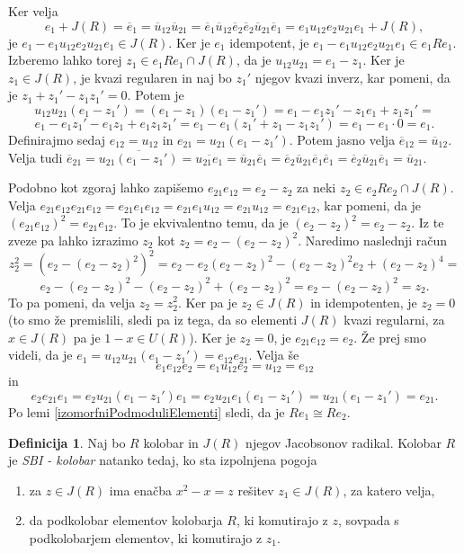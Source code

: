 \documentclass[a4paper, 12pt]{amsart}
\theoremstyle{definition} %
\newtheorem{definicija}{Definicija}[section]
\theoremstyle{plain} %
\begin{document}
Ker velja 
$$
e_1 + J(R) = \overline{e}_1 = \overline{u}_{12} \overline{u}_{21} = \overline{e}_1 \overline{u}_{12} \overline{e}_2 \overline{e}_2 \overline{u}_{21} \overline{e}_1 = e_1 u_{12} e_2 u_{21} e_1 + J(R),
$$
je $e_1 - e_1 u_{12} e_2 u_{21} e_1 \in J(R)$. Ker je $e_1$ idempotent, je  $e_1 - e_1 u_{12} e_2 u_{21} e_1 \in e_1 R e_1$. Izberemo lahko torej $z_1 \in e_1Re_1 \cap J(R)$, da je $u_{12}u_{21} = e_1 - z_1$. Ker je $z_1\in J(R)$, je kvazi regularen in naj bo $z_1'$ njegov kvazi inverz, kar pomeni, da je $z_1 + z_1' - z_1 z_1' = 0$. Potem je 
$$
u_{12} u_{21} (e_1 - z_1') = (e_1 - z_1)(e_1 - z_1') = e_1 - e_1 z_1' - z_1 e_1 + z_1 z_1' = 
$$
$$
e_1 - e_1 z_1' - e_1 z_1 + e_1 z_1 z_1' = e_1 - e_1 (z_1' +z_1 - z_1 z_1') = e_1  - e_1 \cdot 0 = e_1.
$$
Definirajmo sedaj $e_{12} = u_{12} $ in $e_{21} = u_{21} (e_1 - z_1')$. Potem jasno velja $\overline{e}_{12} = \overline{u}_{12}$. Velja tudi $\overline{e}_{21} = \overline{u_{21}(e_1 - z_1')} = \overline{u_{21} e_1} = \overline{u}_{21} \overline{e}_1 = \overline{e}_2 \overline{u}_{21} \overline{e}_1 \overline{e}_1 =  \overline{e}_2 \overline{u}_{21} \overline{e}_1 = \overline{u}_{21}$.

Podobno kot zgoraj lahko zapišemo $e_{21} e_{12} = e_2 - z_2 $ za neki $z_2 \in e_2 Re_2 \cap J(R)$. Velja $e_{21}e_{12}e_{21}e_{12} = e_{21} e_1 e_{12} = e_{21} e_1 u_{12} = e_{21} u_{12} = e_{21} e_{12}$, kar pomeni, da je $(e_{21} e_{12})^2 = e_{21} e_{12}$. To je ekvivalentno temu, da je $(e_2 - z_2 )^2 = e_2 - z_2$. Iz te zveze pa lahko izrazimo $z_2$ kot $z_2 = e_2 - (e_2 - z_2)^2$. Naredimo naslednji račun
$$
z_2^2 = (e_2 - (e_2 - z_2)^2)^2 = e_2 - e_2(e_2-z_2)^2 - (e_2 - z_2 )^2 e_2 + (e_2 - z_2 )^4 = 
$$
$$
e_2 - (e_2 - z_2 )^2 - (e_2 - z_2)^2 + (e_2 - z_2)^2 = e_2 - (e_2 - z_2)^2 = z_2.
$$
To pa pomeni, da velja $z_2 = z_2^2$. Ker pa je $z_2\in J(R)$ in idempotenten, je $z_2 = 0$ (to smo že premislili, sledi pa iz tega, da so elementi $J(R)$ kvazi regularni, za $x\in J(R)$ pa je $1-x\in U(R)$). Ker je $z_2 = 0$, je $e_{21} e_{12} = e_2$. Že prej smo videli, da je $e_1 = u_{12}u_{21}(e_1 - z_1') = e_{12} e_{21}$. Velja še 
$$
e_1 e_{12}e_2 = e_1 u_{12} e_2 = u_{12} = e_{12}
$$
in
$$
e_2 e_{21} e_1 = e_2 u_{21}(e_1 - z_1') e_1 = e_2 u_{21} e_1 (e_1 - z_1') = u_{21}(e_1 - z_1') = e_{21}.
$$
Po lemi \ref{izomorfniPodmoduliElementi} sledi, da je $Re_1 \cong Re_2$.

\endproof

\begin{definicija}
\label{SBI-kolobar}
Naj bo $R$ kolobar in $J(R)$ njegov Jacobsonov radikal. Kolobar $R$ je \emph{SBI - kolobar} natanko tedaj, ko sta izpolnjena pogoja
\begin{enumerate}
\item za $z\in J(R)$ ima enačba $x^2 - x = z$ rešitev $z_1 \in J(R)$, za katero velja, 
\item da podkolobar elementov kolobarja $R$, ki komutirajo z $z$, sovpada s podkolobarjem elementov, ki komutirajo z $z_1$.  
\end{enumerate}
\end{definicija}
\end{document}
